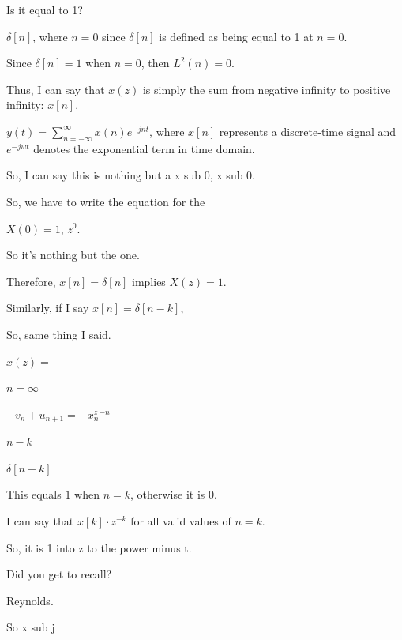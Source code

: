 \documentclass{article}
\begin{document}
Is it equal to 1?





$\delta[n]$, where $n = 0$ since $\delta[n]$ is defined as being equal to 1 at $n=0$.

Since $\delta[n] = 1$ when $n = 0$, then $L^2(n) = 0$.



Thus, I can say that $x(z)$ is simply the sum from negative infinity to positive infinity: $x[n]$.

$y(t) = \sum_{n=-\infty}^{\infty} x(n)e^{-jnt}$, where $x[n]$ represents a discrete-time signal and $e^{−jwt}$ denotes the exponential term in time domain.

So, I can say this is nothing but a x sub 0, x sub 0.

So, we have to write the equation for the

$X(0) = 1$, $z^0$.

So it's nothing but the one.

Therefore, $x[n] = \delta[n]$ implies $X(z) = 1$.

Similarly, if I say $x[n] = \delta[n - k]$,

So, same thing I said.

$x(z) =$

$n = \infty$

$-v_n + u_{n+1} = -x_n^z^{-n}$

$n-k$

$\delta[n-k]$

This equals $1$ when $n = k$, otherwise it is $0$.





I can say that $x[k] \cdot z^{-k}$ for all valid values of $n = k$.

So, it is 1 into z to the power minus t.

Did you get to recall?

Reynolds.

So x sub j
\end{document}
